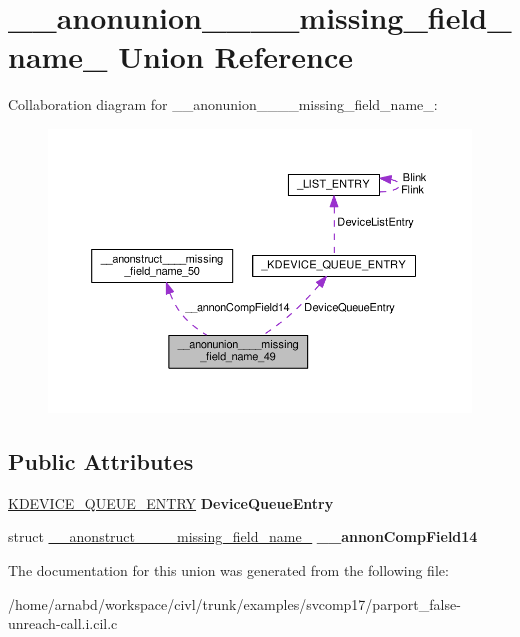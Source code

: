 \hypertarget{union____anonunion________missing__field__name__49}{}\section{\+\_\+\+\_\+anonunion\+\_\+\+\_\+\+\_\+\+\_\+missing\+\_\+field\+\_\+name\+\_ Union Reference}
\label{union____anonunion________missing__field__name__49}


Collaboration diagram for \+\_\+\+\_\+anonunion\+\_\+\+\_\+\+\_\+\+\_\+missing\+\_\+field\+\_\+name\+\_\+:
\nopagebreak
\begin{figure}[H]
\begin{center}
\leavevmode
\includegraphics[width=350pt]{union____anonunion________missing__field__name__49__coll__graph}
\end{center}
\end{figure}
\subsection*{Public Attributes}
\begin{DoxyCompactItemize}
\item 
\hypertarget{union____anonunion________missing__field__name__49_ac4160d57bcf5c81458e82567cb6477f4}{}\hyperlink{struct__KDEVICE__QUEUE__ENTRY}{K\+D\+E\+V\+I\+C\+E\+\_\+\+Q\+U\+E\+U\+E\+\_\+\+E\+N\+T\+R\+Y} {\bfseries Device\+Queue\+Entry}\label{union____anonunion________missing__field__name__49_ac4160d57bcf5c81458e82567cb6477f4}

\item 
\hypertarget{union____anonunion________missing__field__name__49_a8cf1b7f7d8f6ca8717de757597a693e7}{}struct \hyperlink{struct____anonstruct________missing__field__name__50}{\+\_\+\+\_\+anonstruct\+\_\+\+\_\+\+\_\+\+\_\+missing\+\_\+field\+\_\+name\+\_} {\bfseries \+\_\+\+\_\+annon\+Comp\+Field14}\label{union____anonunion________missing__field__name__49_a8cf1b7f7d8f6ca8717de757597a693e7}

\end{DoxyCompactItemize}


The documentation for this union was generated from the following file\+:\begin{DoxyCompactItemize}
\item 
/home/arnabd/workspace/civl/trunk/examples/svcomp17/parport\+\_\+false-\/unreach-\/call.\+i.\+cil.\+c\end{DoxyCompactItemize}

